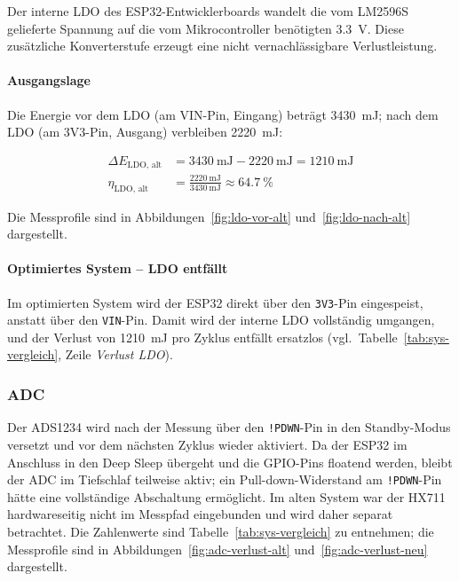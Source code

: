 \documentclass[12pt,a4paper]{article}
\begin{document}
	Der interne LDO des ESP32-Entwicklerboards wandelt die vom LM2596S gelieferte Spannung
	auf die vom Mikrocontroller benötigten \SI{3.3}{\volt}.
	Diese zusätzliche Konverterstufe erzeugt eine nicht vernachlässigbare Verlustleistung.

	\paragraph{Ausgangslage}

	Die Energie vor dem LDO (am VIN-Pin, Eingang) beträgt \SI{3430}{\milli\joule}; nach dem LDO
	(am 3V3-Pin, Ausgang) verbleiben \SI{2220}{\milli\joule}:

	\begin{align}
		\Delta E_{\text{LDO, alt}} &= \SI{3430}{\milli\joule} - \SI{2220}{\milli\joule} = \SI{1210}{\milli\joule} \\
		\eta_{\text{LDO, alt}} &= \frac{\SI{2220}{\milli\joule}}{\SI{3430}{\milli\joule}} \approx \SI{64.7}{\percent}
	\end{align}

	Die Messprofile sind in Abbildungen~\ref{fig:ldo-vor-alt} und~\ref{fig:ldo-nach-alt} dargestellt.

	\paragraph{Optimiertes System -- LDO entfällt}

	Im optimierten System wird der ESP32 direkt über den \texttt{3V3}-Pin eingespeist, anstatt über den
	\texttt{VIN}-Pin. Damit wird der interne LDO vollständig umgangen, und der Verlust von
	\SI{1210}{\milli\joule} pro Zyklus entfällt ersatzlos
	(vgl.\ Tabelle~\ref{tab:sys-vergleich}, Zeile \textit{Verlust LDO}).

	\subsubsection{ADC}

	Der ADS1234 wird nach der Messung über den \texttt{!PDWN}-Pin in den Standby-Modus versetzt
	und vor dem nächsten Zyklus wieder aktiviert.
	Da der ESP32 im Anschluss in den Deep Sleep übergeht und die GPIO-Pins floatend werden,
	bleibt der ADC im Tiefschlaf teilweise aktiv; ein Pull-down-Widerstand am \texttt{!PDWN}-Pin
	hätte eine vollständige Abschaltung ermöglicht.
	Im alten System war der HX711 hardwareseitig nicht im Messpfad eingebunden und wird daher
	separat betrachtet.
	Die Zahlenwerte sind Tabelle~\ref{tab:sys-vergleich} zu entnehmen;
	die Messprofile sind in Abbildungen~\ref{fig:adc-verlust-alt}
	und~\ref{fig:adc-verlust-neu} dargestellt.
\end{document}
